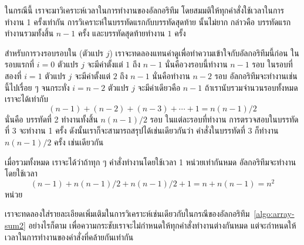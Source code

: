 ใน{\wbr}กรณี{\wbr}นี้ เรา{\wbr}จะ{\wbr}มา{\wbr}วิเคราะห์{\wbr}เวลา{\wbr}ใน{\wbr}การ{\wbr}ทำงาน{\wbr}ของ{\wbr}อัล{\wbr}กอ{\wbr}ริ{\wbr}ทึม{\wbr}
โดย{\wbr}สมมติ{\wbr}ให้{\wbr}ทุก{\wbr}คำสั่ง{\wbr}ใช้เวลา{\wbr}ใน{\wbr}การ{\wbr}ทำงาน 1 ครั้ง{\wbr}เท่า{\wbr}กัน{\wbr}
การ{\wbr}วิเคราะห์{\wbr}ใน{\wbr}บรรทัด{\wbr}แรก{\wbr}กับ{\wbr}บรรทัด{\wbr}สุดท้าย นั้น{\wbr}ไม่{\wbr}ยาก กล่าวคือ บรรทัด{\wbr}แรก{\wbr}ทำงาน{\wbr}รวม{\wbr}ทั้งสิ้น{\wbr}
$n-1$ ครั้ง และ{\wbr}บรรทัด{\wbr}สุดท้าย{\wbr}ทำงาน $1$ ครั้ง{\wbr}

สำหรับ{\wbr}การ{\wbr}วงรอบ{\wbr}รอบ{\wbr}ใน (ตัวแปร $j$)
เรา{\wbr}จะ{\wbr}ทดลอง{\wbr}แทน{\wbr}ค่า{\wbr}ดู{\wbr}เพื่อ{\wbr}ทำ{\wbr}ความ{\wbr}เข้าใจ{\wbr}กับ{\wbr}อัล{\wbr}กอ{\wbr}ริ{\wbr}ทึม{\wbr}นี้{\wbr}ก่อน ใน{\wbr}รอบ{\wbr}แรก{\wbr}ที่ $i=0$ ตัวแปร $j$
จะ{\wbr}มี{\wbr}ค่า{\wbr}ตั้งแต่ $1$ ถึง $n-1$ นั่น{\wbr}คือ{\wbr}วงรอบ{\wbr}นี้{\wbr}ทำงาน $n-1$ รอบ ใน{\wbr}รอบ{\wbr}ที่{\wbr}สอง{\wbr}ที่ $i=1$
ตัวแปร $j$ จะ{\wbr}มี{\wbr}ค่า{\wbr}ตั้งแต่ $2$ ถึง $n-1$ นั่น{\wbr}คือ{\wbr}ทำงาน $n-2$ รอบ{\wbr}
อัล{\wbr}กอ{\wbr}ริ{\wbr}ทึม{\wbr}จะ{\wbr}ทำงาน{\wbr}เช่นนี้{\wbr}ไป{\wbr}เรื่อย ๆ จนกระทั่ง $i=n-2$ ตัวแปร $j$ จะ{\wbr}มี{\wbr}ค่า{\wbr}เดียว{\wbr}คือ $n-1$
ถ้า{\wbr}เรา{\wbr}นับ{\wbr}รวม{\wbr}จำนวน{\wbr}รอบ{\wbr}ทั้งหมด เรา{\wbr}จะ{\wbr}ได้{\wbr}เท่า{\wbr}กับ{\wbr}
\[
(n-1) + (n-2) + (n-3) +\cdots+1 = n(n-1)/2
\]
นั่น{\wbr}คือ บรรทัด{\wbr}ที่ 2 ทำงาน{\wbr}ทั้งสิ้น $n(n-1)/2$ รอบ ใน{\wbr}แต่ละ{\wbr}รอบ{\wbr}ที่ทำงาน{\wbr}
การ{\wbr}ตรวจสอบ{\wbr}ใน{\wbr}บรรทัด{\wbr}ที่ 3 จะ{\wbr}ทำงาน 1 ครั้ง ดังนั้น{\wbr}เรา{\wbr}ก็{\wbr}จะ{\wbr}สามารถ{\wbr}สรุป{\wbr}ได้{\wbr}เช่นเดียวกัน{\wbr}ว่า{\wbr}
คำสั่ง{\wbr}ใน{\wbr}บรรทัด{\wbr}ที่ 3 ก็{\wbr}ทำงาน $n(n-1)/2$ ครั้ง เช่นเดียวกัน{\wbr}

เมื่อ{\wbr}รวม{\wbr}ทั้งหมด เรา{\wbr}จะ{\wbr}ได้{\wbr}ว่า{\wbr}ถ้า{\wbr}ทุก ๆ คำสั่ง{\wbr}ทำงาน{\wbr}โดย{\wbr}ใช้เวลา 1 หน่วย{\wbr}เท่า{\wbr}กัน{\wbr}หมด อัล{\wbr}กอ{\wbr}ริ{\wbr}ทึม{\wbr}จะ{\wbr}ทำงาน{\wbr}โดย{\wbr}ใช้เวลา{\wbr}
\[
(n-1) + n(n-1)/2 + n(n-1)/2 + 1 = n + n(n-1) = n^2
\]
หน่วย{\wbr}

เรา{\wbr}จะ{\wbr}ทดลอง{\wbr}ใส่{\wbr}รายละเอียด{\wbr}เพิ่มเติม{\wbr}ใน{\wbr}การ{\wbr}วิเคราะห์{\wbr}เช่นเดียวกับ{\wbr}ใน{\wbr}กรณี{\wbr}ของ{\wbr}อัล{\wbr}กอ{\wbr}ริ{\wbr}ทึม~\ref{algo:array-sum2}
อย่างไรก็ตาม เพื่อ{\wbr}ความ{\wbr}กระชับ{\wbr}เรา{\wbr}จะ{\wbr}ไม่{\wbr}กำหนด{\wbr}ให้{\wbr}ทุก{\wbr}คำสั่ง{\wbr}ทำงาน{\wbr}ต่าง{\wbr}กัน{\wbr}หมด{\wbr}
แต่{\wbr}จะ{\wbr}กำหนด{\wbr}ให้{\wbr}เวลา{\wbr}ใน{\wbr}การ{\wbr}ทำงาน{\wbr}ของ{\wbr}คำสั่ง{\wbr}ที่{\wbr}คล้าย{\wbr}กัน{\wbr}เท่า{\wbr}กัน{\wbr}

